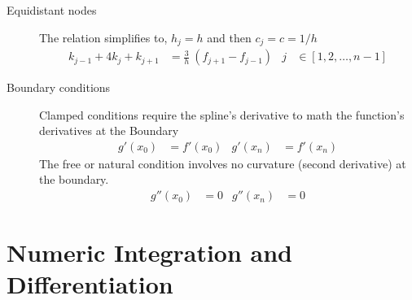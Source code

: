 \begin{description}
    \item[Equidistant nodes] The relation simplifies to, $ h_j = h $ and then
        $ c_j = c = 1/h $
        \begin{align}
            k_{j-1} + 4k_j + k_{j+1} & = \frac{3}{h}\ (f_{j+1} - f_{j-1}) &
            j                        & \in [1,2,\dots,n-1]
        \end{align}

    \item[Boundary conditions] Clamped conditions require the spline's derivative to
        math the function's derivatives at the Boundary
        \begin{align}
            g'(x_0) & = f'(x_0) & g'(x_n) & = f'(x_n)
        \end{align}
        The free or natural condition involves no curvature (second derivative) at the
        boundary.
        \begin{align}
            g''(x_0) & = 0 & g''(x_n) & = 0
        \end{align}
\end{description}

\section{Numeric Integration and Differentiation}

